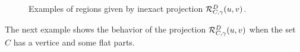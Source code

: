 \begin{figure}[H]
\begin{subfigmatrix}{3}
	\end{subfigmatrix}
	\caption{Examples of regions given by inexact projection ${\cal R}_{C,\gamma}^{D}(u, v)$.}
	\label{fig:baseline}
\end{figure}
The next example shows the behavior of the projection ${\cal R}_{C,\gamma}^{D}(u, v)$ when the set $C$ has a vertice and some flat parts.

